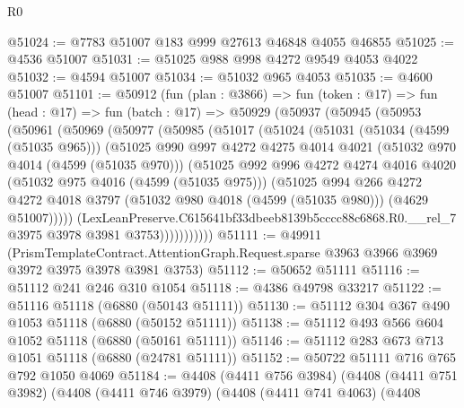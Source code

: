 \begin{lexlean}{R0}
\begin{coremodule}
@51024 := @7783 @51007 @183 @999 @27613 @46848 @4055 @46855
@51025 := @4536 @51007
@51031 := @51025 @988 @998 @4272 @9549 @4053 @4022
@51032 := @4594 @51007
@51034 := @51032 @965 @4053
@51035 := @4600 @51007
@51101 := @50912
    (fun (plan : @3866) =>
    fun (token : @17) =>
    fun (head : @17) =>
    fun (batch : @17) =>
    @50929
      (@50937
        (@50945
          (@50953
            (@50961
              (@50969
                (@50977
                  (@50985
                    (@51017
                      (@51024
                        (@51031
                          (@51034 (@4599 (@51035 @965)))
                          (@51025
                            @990
                            @997
                            @4272
                            @4275
                            @4014
                            @4021
                            (@51032 @970 @4014 (@4599 (@51035 @970)))
                            (@51025
                              @992
                              @996
                              @4272
                              @4274
                              @4016
                              @4020
                              (@51032 @975 @4016 (@4599 (@51035 @975)))
                              (@51025
                                @994
                                @266
                                @4272
                                @4272
                                @4018
                                @3797
                                (@51032 @980 @4018 (@4599 (@51035 @980)))
                                (@4629 @51007)))))
                        (LexLeanPreserve.C615641bf33dbeeb8139b5cccc88c6868.R0.__rel_7
                          @3975
                          @3978
                          @3981
                          @3753)))))))))))
@51111 := @49911
    (PrismTemplateContract.AttentionGraph.Request.sparse
      @3963
      @3966
      @3969
      @3972
      @3975
      @3978
      @3981
      @3753)
@51112 := @50652 @51111
@51116 := @51112 @241 @246 @310 @1054
@51118 := @4386 @49798 @33217
@51122 := @51116 @51118 (@6880 (@50143 @51111))
@51130 := @51112 @304 @367 @490 @1053 @51118 (@6880 (@50152 @51111))
@51138 := @51112 @493 @566 @604 @1052 @51118 (@6880 (@50161 @51111))
@51146 := @51112 @283 @673 @713 @1051 @51118 (@6880 (@24781 @51111))
@51152 := @50722 @51111 @716 @765 @792 @1050 @4069
@51184 := @4408
    (@4411 @756 @3984)
    (@4408
      (@4411 @751 @3982)
      (@4408
        (@4411 @746 @3979)
        (@4408
          (@4411 @741 @4063)
          (@4408

\end{coremodule}
\end{lexlean}

